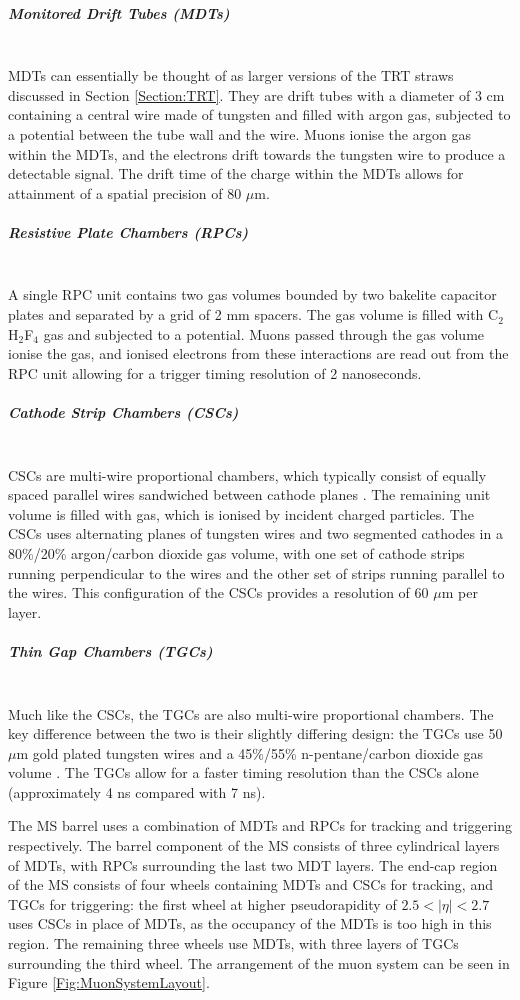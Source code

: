\documentclass[12pt,a4paper,epsf,portrait,times,epsfig]{report}
\begin{document}
		\subparagraph{Monitored Drift Tubes (MDTs)}\label{Section:MDTs}\mbox{}\\
		MDTs can essentially be thought of as larger versions of the TRT straws discussed in Section \ref{Section:TRT}. They are drift tubes with a diameter of 3 cm containing a central wire made of tungsten and filled with argon gas, subjected to a potential between the tube wall and the wire. Muons ionise the argon gas within the MDTs, and the electrons drift towards the tungsten wire to produce a detectable signal. The drift time of the charge within the MDTs allows for attainment of a spatial precision of 80 $\mu$m.

		\subparagraph{Resistive Plate Chambers (RPCs)}\label{Section:RPCs}\mbox{}\\
		A single RPC unit contains two gas volumes bounded by two bakelite capacitor plates and separated by a grid of 2 mm spacers. The gas volume is filled with C$_{2}$H$_{2}$F$_{4}$ gas and subjected to a potential. Muons passed through the gas volume ionise the gas, and ionised electrons from these interactions are read out from the RPC unit allowing for a trigger timing resolution of 2 nanoseconds. 
		
		\subparagraph{Cathode Strip Chambers (CSCs)}\label{Section:CSCs}\mbox{}\\
		CSCs are multi-wire proportional chambers, which typically consist of equally spaced parallel wires sandwiched between cathode planes \cite{MultiwirePropChamber}. The remaining unit volume is filled with gas, which is ionised by incident charged particles. The CSCs uses alternating planes of tungsten wires and two segmented cathodes in a 80\%/20\% argon/carbon dioxide gas volume, with one set of cathode strips running perpendicular to the wires and the other set of strips running parallel to the wires. This configuration of the CSCs provides a resolution of 60 $\mu$m per layer. 

		\subparagraph{Thin Gap Chambers (TGCs)}\label{Section:TGCs}\mbox{}\\
		Much like the CSCs, the TGCs are also multi-wire proportional chambers. The key difference between the two is their slightly differing design: the TGCs use  50 $\mu$m gold plated tungsten wires and a 45\%/55\% n-pentane/carbon dioxide gas volume \cite{ATLASTGCCertification}. The TGCs allow for a faster timing resolution than the CSCs alone (approximately 4 ns compared with 7 ns). 

		The MS barrel uses a combination of MDTs and RPCs for tracking and triggering respectively. The barrel component of the MS consists of three cylindrical layers of MDTs, with RPCs surrounding the last two MDT layers. The end-cap region of the MS consists of four wheels containing MDTs and CSCs for tracking, and TGCs for triggering: the first wheel at higher pseudorapidity of $2.5 < |\eta| < 2.7$ uses CSCs in place of MDTs, as the occupancy of the MDTs is too high in this region. The remaining three wheels use MDTs, with three layers of TGCs surrounding the third wheel. The arrangement of the muon system can be seen in Figure \ref{Fig:MuonSystemLayout}. 
\end{document}
